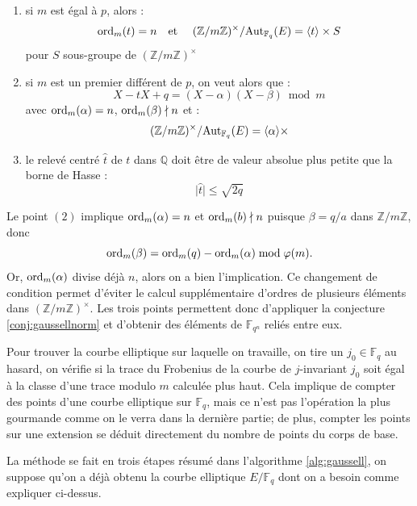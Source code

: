 \documentclass[a4paper]{article} %
\numberwithin{section}{part}
\numberwithin{equation}{section}
\newcommand\zmodn[1]{\mathbb{Z}/#1\mathbb{Z}}
\newcommand\zmodninv[1]{(\mathbb{Z}/#1\mathbb{Z})^{\times}}
\newcommand\GF[1]{\mathbb{F}_{#1}}
\newcommand\QQ{\mathbb{Q}}
\newcommand\etmath{\textup{\quad et \quad}}
\newcommand\groupgen[1]{\langle{#1}\rangle}
\newcommand\ord[2]{\textup{ord}_{#1}(#2)}
\begin{document}
\vspace{0.3cm}
\begin{enumerate}[(1)]
    \item si $m$ est égal à $p$, alors :
	\begin{equation}
	\ord{m}{t} = n \etmath\zmodninv{m}/\textup{Aut}_{\GF{q}}(E) = 
	\groupgen{t}\times S
	\end{equation}
	pour $S$ sous-groupe de $\zmodninv{m}$
    \item si $m$ est un premier différent de $p$, on veut alors que :
	\begin{equation}
	X - tX + q = (X - \alpha)(X - \beta)\bmod{m}
	\end{equation}
	avec $\ord{m}{\alpha} = n$, $\ord{m}{\beta}\nmid n$ et :
	\begin{equation}
    \zmodninv{m}/\textup{Aut}_{\GF{q}}(E) = \groupgen{\alpha}\times
	\end{equation}
	\item le relevé centré $\hat{t}$ de $t$ dans $\QQ$ doit être de valeur
absolue plus petite que la borne de Hasse :
	\begin{equation}
	\vert{\hat{t}}\vert \leq \sqrt{2q}
	\end{equation}
    \end{enumerate}
\vspace{0.3cm}
Le point $(2)$ implique $\ord{m}{\alpha} = n$ et $\ord{m}{b}\nmid n$ 
puisque $\beta = q/a$ dans $\zmodn{m}$, donc 
\begin{equation}
\ord{m}{\beta} = \ord{m}{q} - \ord{m}{\alpha}\bmod{\varphi(m)}.
\end{equation}
Or, $\ord{m}{\alpha}$ divise déjà $n$, alors on a bien l'implication. Ce
changement de condition permet d'éviter le calcul supplémentaire d'ordres
de plusieurs éléments dans $\zmodninv{m}$. Les trois points permettent donc 
d'appliquer la conjecture \ref{conj:gaussellnorm} et d'obtenir des éléments de 
$\GF{q^n}$ reliés entre eux.\par
Pour trouver la courbe elliptique sur laquelle on travaille, on tire un
$j_0\in\GF{q}$ au hasard, on vérifie si la trace du Frobenius de la courbe de
$j$-invariant $j_0$ soit égal à la classe d'une trace modulo $m$ calculée plus 
haut. Cela implique de compter des points d'une courbe elliptique sur $\GF{q}$,
mais ce n'est pas l'opération la plus gourmande comme on le verra dans la
dernière partie; de plus, compter les points sur une extension se déduit
directement du nombre de points du corps de base.\par 
La méthode se fait en trois étapes résumé dans l'algorithme \ref{alg:gaussell}, 
on suppose qu'on a déjà obtenu la courbe elliptique $E/\GF{q}$ dont on a besoin
comme expliquer ci-dessus.\par
\end{document}
